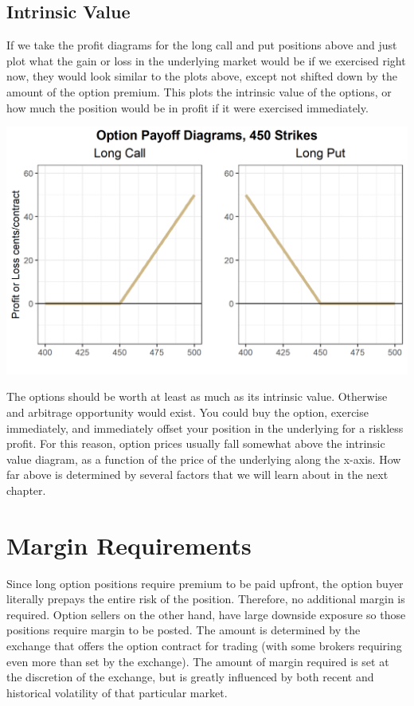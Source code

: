 \documentclass[
  letterpaper,
  DIV=11,
  numbers=noendperiod]{scrreprt}
\begin{document}
\subsection{Intrinsic Value}\label{intrinsic-value}

If we take the profit diagrams for the long call and put positions above
and just plot what the gain or loss in the underlying market would be if
we exercised right now, they would look similar to the plots above,
except not shifted down by the amount of the option premium. This plots
the intrinsic value of the options, or how much the position would be in
profit if it were exercised immediately.

\includegraphics{assets/Options1-optionintrinsic.png}

The options should be worth at least as much as its intrinsic value.
Otherwise and arbitrage opportunity would exist. You could buy the
option, exercise immediately, and immediately offset your position in
the underlying for a riskless profit. For this reason, option prices
usually fall somewhat above the intrinsic value diagram, as a function
of the price of the underlying along the x-axis. How far above is
determined by several factors that we will learn about in the next
chapter.

\section{Margin Requirements}\label{margin-requirements}

Since long option positions require premium to be paid upfront, the
option buyer literally prepays the entire risk of the position.
Therefore, no additional margin is required. Option sellers on the other
hand, have large downside exposure so those positions require margin to
be posted. The amount is determined by the exchange that offers the
option contract for trading (with some brokers requiring even more than
set by the exchange). The amount of margin required is set at the
discretion of the exchange, but is greatly influenced by both recent and
historical volatility of that particular market.
\end{document}
